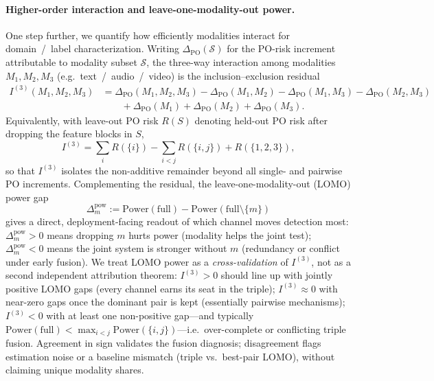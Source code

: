 
\paragraph{Higher-order interaction and leave-one-modality-out power.}
One step further, we quantify how efficiently modalities interact for
domain~/~label characterization.
Writing $\Delta_{\mathrm{PO}}(\mathcal{S})$ for the PO-risk increment
attributable to modality subset $\mathcal{S}$, the three-way interaction
among modalities $M_1,M_2,M_3$ (e.g.\ text~/~audio~/~video) is the
inclusion--exclusion residual
\begin{equation}
\label{eq:I3-delta-po}
\begin{aligned}
I^{(3)}(M_1,M_2,M_3)
&=
\Delta_{\mathrm{PO}}(M_1,M_2,M_3)
-
\Delta_{\mathrm{PO}}(M_1,M_2)
-
\Delta_{\mathrm{PO}}(M_1,M_3)
-
\Delta_{\mathrm{PO}}(M_2,M_3)\\
&\qquad
+
\Delta_{\mathrm{PO}}(M_1)
+
\Delta_{\mathrm{PO}}(M_2)
+
\Delta_{\mathrm{PO}}(M_3).
\end{aligned}
\end{equation}
Equivalently, with leave-out PO risk $R(S)$ denoting held-out PO risk after
dropping the feature blocks in $S$,
\begin{equation}
\label{eq:I3-leaveout}
I^{(3)}
=
\sum_{i} R(\{i\})
-
\sum_{i<j} R(\{i,j\})
+
R(\{1,2,3\}),
\end{equation}
so that $I^{(3)}$ isolates the non-additive remainder beyond all single- and
pairwise PO increments.
Complementing the residual, the leave-one-modality-out (LOMO) power gap
\begin{equation}
\label{eq:lomo-power}
\Delta^{\mathrm{pow}}_{m}
:=
\mathrm{Power}(\mathrm{full})
-
\mathrm{Power}(\mathrm{full}\setminus\{m\})
\end{equation}
gives a direct, deployment-facing readout of which channel moves detection
most: $\Delta^{\mathrm{pow}}_{m}>0$ means dropping $m$ hurts power
(modality helps the joint test);
$\Delta^{\mathrm{pow}}_{m}<0$ means the joint system is stronger without $m$
(redundancy or conflict under early fusion).
We treat LOMO power as a \emph{cross-validation} of $I^{(3)}$, not as a
second independent attribution theorem:
$I^{(3)}>0$ should line up with jointly positive LOMO gaps
(every channel earns its seat in the triple);
$I^{(3)}\approx 0$ with near-zero gaps once the dominant pair is kept
(essentially pairwise mechanisms);
$I^{(3)}<0$ with at least one non-positive gap---and typically
$\mathrm{Power}(\mathrm{full})<\max_{i<j}\mathrm{Power}(\{i,j\})$---i.e.\
over-complete or conflicting triple fusion.
Agreement in sign validates the fusion diagnosis; disagreement flags
estimation noise or a baseline mismatch (triple vs.\ best-pair LOMO),
without claiming unique modality shares.


